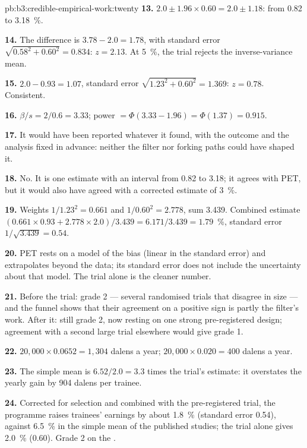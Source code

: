 \begin{solution}{pb:b3:credible-empirical-work:twenty}
\textbf{13.} $2.0 \pm 1.96 \times 0.60 = 2.0 \pm 1.18$: from 0.82 to 3.18~\%.

\textbf{14.} The difference is $3.78 - 2.0 = 1.78$, with standard error
$\sqrt{0.58^2 + 0.60^2} = 0.834$: $z = 2.13$. At 5~\%, the trial rejects the
inverse-variance mean.

\textbf{15.} $2.0 - 0.93 = 1.07$, standard error $\sqrt{1.23^2 + 0.60^2} = 1.369$:
$z = 0.78$. Consistent.

\textbf{16.} $\beta/s = 2/0.6 = 3.33$; power $= \Phi(3.33 - 1.96) = \Phi(1.37) =
0.915$.

\textbf{17.} It would have been reported whatever it found, with the outcome and
the analysis fixed in advance: neither the filter nor forking paths could have
shaped it.

\textbf{18.} No. It is one estimate with an interval from 0.82 to 3.18; it agrees
with PET, but it would also have agreed with a corrected estimate of 3~\%.

\textbf{19.} Weights $1/1.23^2 = 0.661$ and $1/0.60^2 = 2.778$, sum 3.439. Combined
estimate $(0.661 \times 0.93 + 2.778 \times 2.0)/3.439 = 6.171/3.439 = 1.79$~\%,
standard error $1/\sqrt{3.439} = 0.54$.

\textbf{20.} PET rests on a model of the bias (linear in the standard error) and
extrapolates beyond the data; its standard error does not include the
uncertainty about that model. The trial alone is the cleaner number.

\textbf{21.} Before the trial: grade 2 --- several randomised trials that
disagree in size --- and the funnel shows that their agreement on a positive sign
is partly the filter's work. After it: still grade 2, now resting on one strong
pre-registered design; agreement with a second large trial elsewhere would
give grade 1.

\textbf{22.} $20{,}000 \times 0.0652 = 1{,}304$ dalens a year; $20{,}000 \times 0.020 =
400$ dalens a year.

\textbf{23.} The simple mean is $6.52/2.0 = 3.3$ times the trial's estimate: it
overstates the yearly gain by 904 dalens per trainee.

\textbf{24.} Corrected for selection and combined with the pre-registered trial,
the programme raises trainees' earnings by about 1.8~\% (standard error 0.54),
against 6.5~\% in the simple mean of the published studies; the trial alone gives
2.0~\% (0.60). Grade 2 on the .
\end{solution}
